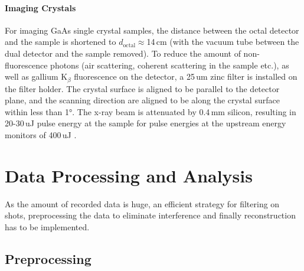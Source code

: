 \paragraph{Imaging Crystals}
For imaging GaAs single crystal samples, the distance between the octal detector and the sample is shortened to $d_\text{octal}\approx$14\,cm (with the vacuum tube between the dual detector and the sample removed). To reduce the amount of non-fluorescence photons  (air scattering, coherent scattering in the sample etc.), as well as gallium K$_\beta$ fluorescence on the detector, a 25\,um zinc filter is installed on the filter holder. The crystal surface is aligned to be parallel to the detector plane, and the scanning direction are aligned to be along the crystal surface within less than 1°. The x-ray beam is attenuated by 0.4\,mm silicon, resulting in 20-30\,uJ pulse energy at the sample for pulse energies at the upstream energy monitors of 400\,uJ \cite{yabashi2015}.

\section{Data Processing and Analysis}
As the amount of recorded data is huge, an efficient strategy for filtering on shots, preprocessing the data to eliminate interference and finally reconstruction has to be implemented.
\subsection{Preprocessing}










